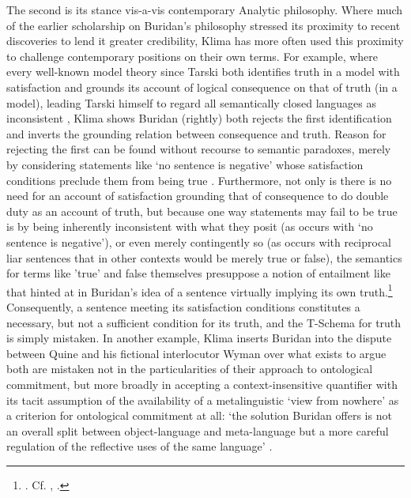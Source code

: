 \documentclass[]{article}
\begin{document}
The second is its stance vis-a-vis contemporary Analytic philosophy. 
Where much of the earlier scholarship on Buridan's philosophy 
stressed its proximity to recent discoveries 
to lend it greater credibility, 
Klima has more often used this proximity 
to challenge contemporary positions on their own terms. 
For example, 
where every well-known model theory since Tarski 
both 
identifies truth in a model with satisfaction 
and 
grounds its account of logical consequence on that of truth (in a model), 
leading Tarski himself to regard all semantically closed languages 
as inconsistent \autocite[348-349]{Tarski1943}, 
Klima shows Buridan (rightly) 
both
rejects the first identification 
and 
inverts the grounding relation between consequence and truth. 
Reason for rejecting the first can be found without recourse to semantic paradoxes, 
merely by considering statements like `no sentence is negative' 
whose satisfaction conditions preclude them from being true \autocite[96-100]{Klima2004}. 
Furthermore, 
not only is there is no need for an account of satisfaction grounding that of consequence to do double duty as an account of truth, 
but because one way statements may fail to be true 
is by being inherently inconsistent with what they posit 
(as occurs with `no sentence is negative'), 
or even merely contingently so 
(as occurs with reciprocal liar sentences that in other contexts would be merely true or false), 
the semantics for terms like 'true' and false themselves presuppose a notion of entailment like that hinted at in Buridan's idea of a sentence virtually implying its own truth.\footnote{\autocite[101-107]{Klima2004}. Cf. \autocite[221-225]{Klima2009}, \autocite[22-27]{Hughes1982}.} 
Consequently, 
a sentence meeting its satisfaction conditions constitutes a necessary, 
but not a sufficient 
condition for its truth, 
and the T-Schema for truth is simply mistaken. 
In another example, 
Klima inserts Buridan into the dispute between Quine and his fictional interlocutor Wyman over what exists 
to argue 
both are mistaken 
not in the particularities of their approach to ontological commitment, 
but more broadly 
in accepting a context-insensitive quantifier 
with its tacit assumption of the availability of a metalinguistic `view from nowhere' 
as a criterion for ontological commitment at all:  `the solution Buridan
offers is not an overall split between object-language and meta-language
but a more careful regulation of the reﬂective uses of the same language' \autocite[174]{Klima2009}.
\end{document}
